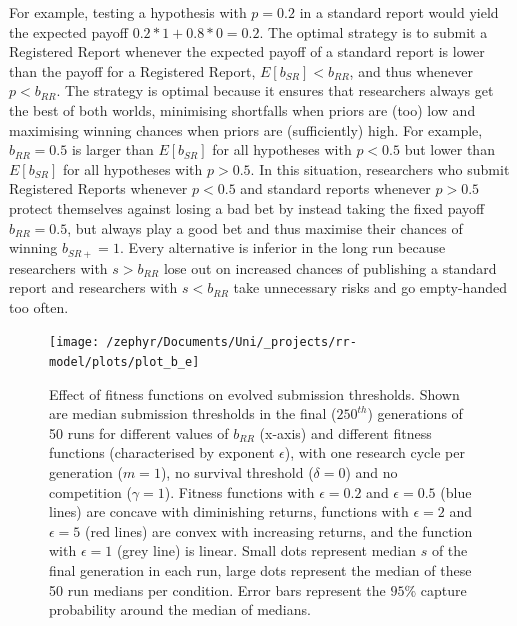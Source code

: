 \documentclass[british,,man,mask,floatsintext]{apa6}
\begin{document}
For example, testing a hypothesis with \(p = 0.2\) in a standard report would yield the expected payoff \(0.2 * 1 + 0.8 * 0 = 0.2\).
The optimal strategy is to submit a Registered Report whenever the expected payoff of a standard report is lower than the payoff for a Registered Report, \(E[b_{SR}] < b_{RR}\), and thus whenever \(p < b_{RR}\).
The strategy is optimal because it ensures that researchers always get the best of both worlds, minimising shortfalls when priors are (too) low and maximising winning chances when priors are (sufficiently) high.
For example, \(b_{RR} = 0.5\) is larger than \(E[b_{SR}]\) for all hypotheses with \(p < 0.5\) but lower than \(E[b_{SR}]\) for all hypotheses with \(p > 0.5\).
In this situation, researchers who submit Registered Reports whenever \(p<0.5\) and standard reports whenever \(p>0.5\) protect themselves against losing a bad bet by instead taking the fixed payoff \(b_{RR} = 0.5\), but always play a good bet and thus maximise their chances of winning \(b_{SR+} = 1\).
Every alternative is inferior in the long run because researchers with \(s > b_{RR}\) lose out on increased chances of publishing a standard report and researchers with \(s < b_{RR}\) take unnecessary risks and go empty-handed too often.



\begin{figure}

{\centering \texttt{[image: /zephyr/Documents/Uni/\_projects/rr-model/plots/plot\_b\_e]} 

}

\caption{Effect of fitness functions on evolved submission thresholds. Shown are median submission thresholds in the final (\(250^{th}\)) generations of 50 runs for different values of \(b_{RR}\) (x-axis) and different fitness functions (characterised by exponent \(\epsilon\)), with one research cycle per generation (\(m = 1\)), no survival threshold (\(\delta = 0\)) and no competition (\(\gamma = 1\)). Fitness functions with \(\epsilon = 0.2\) and \(\epsilon = 0.5\) (blue lines) are concave with diminishing returns, functions with \(\epsilon = 2\) and \(\epsilon = 5\) (red lines) are convex with increasing returns, and the function with \(\epsilon = 1\) (grey line) is linear. Small dots represent median \(s\) of the final generation in each run, large dots represent the median of these 50 run medians per condition. Error bars represent the \(95\%\) capture probability around the median of medians.}\label{fig:epsilonplot}
\end{figure}
\end{document}
